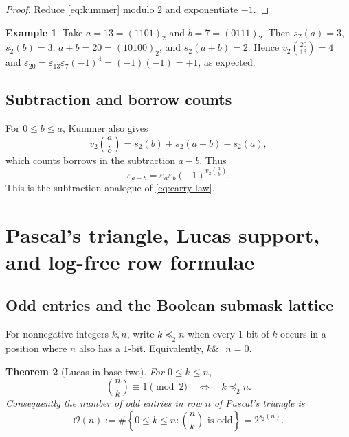 \documentclass[11pt,oneside]{article}
\newtheorem{theorem}{Theorem}[section]
\theoremstyle{definition}
\newtheorem{example}[theorem]{Example}
\theoremstyle{remark}
\newcommand{\vtwo}{v_2}
\newcommand{\bitsum}{s_2}
\newcommand{\eps}{\varepsilon}
\newcommand{\submask}{\preccurlyeq_2}
\begin{document}
\begin{proof}
Reduce \cref{eq:kummer} modulo $2$ and exponentiate $-1$.
\end{proof}

\begin{example}
Take $a=13=(1101)_2$ and $b=7=(0111)_2$.  Then
$\bitsum(a)=3$, $\bitsum(b)=3$, $a+b=20=(10100)_2$, and
$\bitsum(a+b)=2$.  Hence $\vtwo\binom{20}{13}=4$ and
$\eps_{20}=\eps_{13}\eps_7(-1)^4=( -1)(-1)=+1$, as expected.
\end{example}

\subsection{Subtraction and borrow counts}

For $0\le b\le a$, Kummer also gives
\begin{equation}\label{eq:borrow-law}
 \vtwo\binom ab=\bitsum(b)+\bitsum(a-b)-\bitsum(a),
\end{equation}
which counts borrows in the subtraction $a-b$.  Thus
\begin{equation}\label{eq:subtraction-thue-morse}
 \eps_{a-b}=\eps_a\eps_b(-1)^{\vtwo\binom ab}.
\end{equation}
This is the subtraction analogue of \cref{eq:carry-law}.

\section{Pascal's triangle, Lucas support, and log-free row formulae}

\subsection{Odd entries and the Boolean submask lattice}

For nonnegative integers $k,n$, write $k\submask n$ when every $1$-bit of
$k$ occurs in a position where $n$ also has a $1$-bit.  Equivalently,
$k\mathbin{\&}\neg n=0$.

\begin{theorem}[Lucas in base two]\label{thm:lucas}
For $0\le k\le n$,
\begin{equation}\label{eq:lucas-submask}
 \binom nk\equiv1\pmod2
 \quad\Longleftrightarrow\quad
 k\submask n.
\end{equation}
Consequently the number of odd entries in row $n$ of Pascal's triangle is
\begin{equation}\label{eq:glaisher}
 \mathcal O(n):=\#\left\{0\le k\le n:\binom nk\text{ is odd}\right\}
 =2^{\bitsum(n)}.
\end{equation}
\end{theorem}
\end{document}

